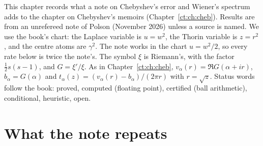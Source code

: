 \label{cw:ch:wiener}

This chapter records what a note on Chebyshev's error and Wiener's spectrum adds to the chapter on Chebyshev's memoirs (Chapter~\ref{ct:ch:cheb}). Results are from an unrefereed note of Polson (November 2026) unless a source is named. We use the book's chart: the Laplace variable is $u=w^2$, the Thorin variable is $z=r^2$, and the centre atoms are $\gamma^2$. The note works in the chart $u=w^2/2$, so every rate below is twice the note's. The symbol $\xi$ is Riemann's, with the factor $\frac12s(s-1)$, and $G=\xi'/\xi$. As in Chapter~\ref{ct:ch:cheb}, $v_\alpha(r)=\Re G(\alpha+ir)$, $b_\alpha=G(\alpha)$ and $t_\alpha(z)=(v_\alpha(r)-b_\alpha)/(2\pi r)$ with $r=\sqrt z$. Status words follow the book: proved, computed (floating point), certified (ball arithmetic), conditional, heuristic, open.

\section{What the note repeats}\label{cw:sec:known}


